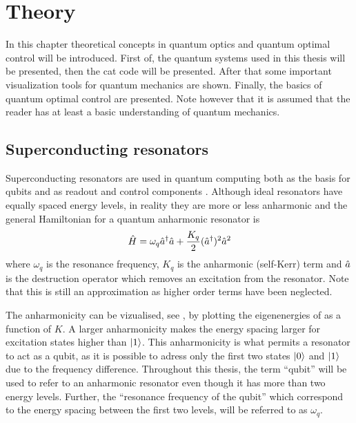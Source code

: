 \documentclass[main.tex]{subfiles}
\begin{document}
\chapter{Theory}
In this chapter theoretical concepts in quantum optics and quantum optimal control will be introduced.
First of, the quantum systems used in this thesis will be presented, then the cat code will be presented.
After that some important visualization tools for quantum mechanics are shown.
Finally, the basics of quantum optimal control are presented.
Note however that it is assumed that the reader has at least a basic understanding of quantum mechanics.

\section{Superconducting resonators}
Superconducting resonators are used in quantum computing both as the basis for qubits and as readout and control components \cite{}.
Although ideal resonators have equally spaced energy levels, in reality they are more or less anharmonic and the general Hamiltonian for a quantum anharmonic resonator is
\begin{equation}
    \hat{H} = \omega_{q} \hat{a}^\dagger\hat{a} + \frac{K_q}{2} (\hat{a}^\dagger)^2\hat{a}^2
    \label{eq:resonator-hamiltonian}
\end{equation}
where \( \omega_{q} \) is the resonance frequency, \( K_q \) is the anharmonic (self-Kerr) term and \(\hat{a}\) is the destruction operator which removes an excitation from the resonator.
Note that this is still an approximation as higher order terms have been neglected.

The anharmonicity can be vizualised, see , by plotting the eigenenergies of  as a function of \( K \).
A larger anharmonicity makes the energy spacing larger for excitation states higher than \(\ket{1}\).
This anharmonicity is what permits a resonator to act as a qubit, as it is possible to adress only the first two states \( \ket{0} \) and \( \ket{1} \) due to the frequency difference.
Throughout this thesis, the term ``qubit'' will be used to refer to an anharmonic resonator even though it has more than two energy levels.
Further, the ``resonance frequency of the qubit'' which correspond to the energy spacing between the first two levels, will be referred to as \( \omega_{q} \).

\end{document}
